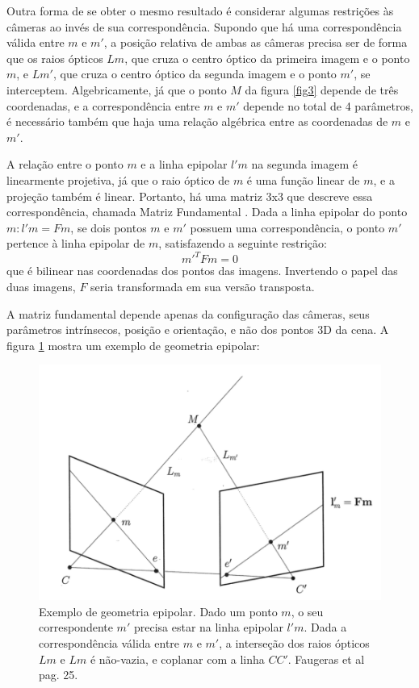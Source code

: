 Outra forma de se obter o mesmo resultado é considerar algumas restrições às câmeras ao invés de sua correspondência. Supondo que há uma correspondência válida entre $m$ e $m'$, a posição relativa de ambas as câmeras precisa ser de forma que os raios ópticos $Lm$, que cruza o centro óptico da primeira imagem e o ponto $m$, e $Lm'$, que cruza o centro óptico da segunda imagem e o ponto $m'$, se interceptem. Algebricamente, já que o ponto $M$ da figura \ref{fig3} depende de três coordenadas, e a correspondência entre $m$ e $m'$ depende no total de 4 parâmetros, é necessário também que haja uma relação algébrica entre as coordenadas de $m$ e $m'$.

A relação entre o ponto $m$ e a linha epipolar $l'm$ na segunda imagem é linearmente projetiva, já que o raio óptico de $m$ é uma função linear de $m$, e a projeção também é linear. Portanto, há uma matriz 3x3 que descreve essa correspondência, chamada Matriz Fundamental \cite{Faugeras-Geometry}. Dada a linha epipolar do ponto $m: l'm = Fm$, se dois pontos $m$ e $m'$ possuem uma correspondência, o ponto $m'$ pertence à linha epipolar de $m$, satisfazendo a seguinte restrição: 
\begin{equation}\label{eq4}m'^{T}Fm = 0\end{equation} que é bilinear nas coordenadas dos pontos das imagens. Invertendo o papel das duas imagens, $F$ seria transformada em sua versão transposta.

A matriz fundamental depende apenas da configuração das câmeras, seus parâmetros intrínsecos, posição e orientação, e não dos pontos 3D da cena. A figura \ref{fig4} mostra um exemplo de geometria epipolar:

\begin{figure}
	\centering
		\includegraphics{Imagens/figura2-4.png}
	\caption{Exemplo de geometria epipolar. Dado um ponto $m$, o seu correspondente $m'$ precisa estar na linha epipolar $l'm$. Dada a correspondência válida entre $m$ e $m'$, a interseção dos raios ópticos $Lm$ e $Lm$ é não-vazia, e coplanar com a linha $CC'$. Faugeras et al \cite{Faugeras-Geometry} pag. 25.}
	\label{fig4}
\end{figure}

